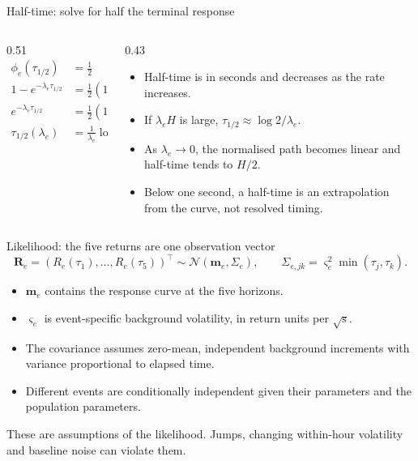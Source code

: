 \documentclass[aspectratio=169,11pt]{beamer}
\newcommand{\source}[1]{\par\vfill{\scriptsize\color{muted}#1}\par}
\begin{document}
\begin{frame}{Half-time: solve for half the terminal response}
\begin{columns}[c,onlytextwidth]
\begin{column}{0.51\textwidth}
\begin{align*}
\phi_e(\tau_{1/2})&=\tfrac12\\[0.4em]
1-e^{-\lambda_e\tau_{1/2}}&=\tfrac12(1-e^{-\lambda_e H})\\[0.4em]
e^{-\lambda_e\tau_{1/2}}&=\tfrac12(1+e^{-\lambda_e H})\\[0.4em]
\tau_{1/2}(\lambda_e)&=\frac1{\lambda_e}\log\frac2{1+e^{-\lambda_e H}}.
\end{align*}\end{column}
\begin{column}{0.43\textwidth}\begin{itemize}
\item Half-time is in seconds and decreases as the rate increases.
\item If $\lambda_e H$ is large, $\tau_{1/2}\approx\log 2/\lambda_e$.
\item As $\lambda_e\to0$, the normalised path becomes linear and half-time tends to $H/2$.
\item Below one second, a half-time is an extrapolation from the curve, not resolved timing.
\end{itemize}\end{column}\end{columns}
\end{frame}

\begin{frame}{Likelihood: the five returns are one observation vector}
\[\mathbf R_e=(R_e(\tau_1),\ldots,R_e(\tau_5))^\top
\sim\mathcal N(\mathbf m_e,\Sigma_e),\qquad
\Sigma_{e,jk}=\varsigma_e^2\min(\tau_j,\tau_k).\]
\begin{itemize}
\item $\mathbf m_e$ contains the response curve at the five horizons.
\item $\varsigma_e$ is event-specific background volatility, in return units per $\sqrt{\mathrm{s}}$.
\item The covariance assumes zero-mean, independent background increments with variance proportional to elapsed time.
\item Different events are conditionally independent given their parameters and the population parameters.
\end{itemize}
\source{These are assumptions of the likelihood. Jumps, changing within-hour volatility and baseline noise can violate them.}
\end{frame}
\end{document}
